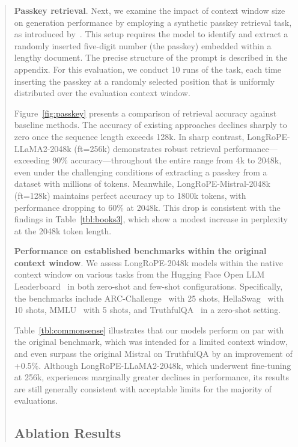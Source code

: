\begin{abstract}
\textbf{Passkey retrieval}. Next, we examine the impact of context window size on generation performance by employing a synthetic passkey retrieval task, as introduced by~\cite{passkey}. This setup requires the model to identify and extract a randomly inserted five-digit number (the passkey) embedded within a lengthy document. The precise structure of the prompt is described in the appendix. For this evaluation, we conduct 10 runs of the task, each time inserting the passkey at a randomly selected position that is uniformly distributed over the evaluation context window.

Figure~\ref{fig:passkey} presents a comparison of retrieval accuracy against baseline methods. The accuracy of existing approaches declines sharply to zero once the sequence length exceeds 128k. In sharp contrast, LongRoPE-LLaMA2-2048k (ft=256k) demonstrates robust retrieval performance—exceeding 90\% accuracy—throughout the entire range from 4k to 2048k, even under the challenging conditions of extracting a passkey from a dataset with millions of tokens. Meanwhile, LongRoPE-Mistral-2048k (ft=128k) maintains perfect accuracy up to 1800k tokens, with performance dropping to 60\% at 2048k. This drop is consistent with the findings in Table~\ref{tbl:books3}, which show a modest increase in perplexity at the 2048k token length.

\textbf{Performance on established benchmarks within the original context window}. We assess LongRoPE-2048k models within the native context window on various tasks from the Hugging Face Open LLM Leaderboard~\cite{huggingfaceboard} in both zero-shot and few-shot configurations. Specifically, the benchmarks include ARC-Challenge~\cite{allenai:arc} with 25 shots, HellaSwag~\cite{zellers2019hellaswag} with 10 shots, MMLU~\cite{mmlu} with 5 shots, and TruthfulQA~\cite{lin2021truthfulqa} in a zero-shot setting.

Table~\ref{tbl:commonsense} illustrates that our models perform on par with the original benchmark, which was intended for a limited context window, and even surpass the original Mistral on TruthfulQA by an improvement of +0.5\%. Although LongRoPE-LLaMA2-2048k, which underwent fine-tuning at 256k, experiences marginally greater declines in performance, its results are still generally consistent with acceptable limits for the majority of evaluations.

\subsection{Ablation Results}


\end{abstract}
